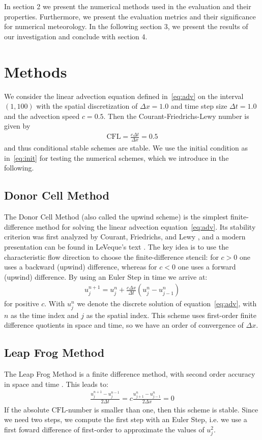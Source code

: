 In section 2 we present the numerical methods used in the evaluation and their properties. Furthermore, we present the evaluation metrics and their significance for numerical
meteorology.
In the following section 3, we present the results of our investigation and conclude with section 4.

\section{Methods}

We consider the linear advection equation defined in~\eqref{eq:adv} on the
interval $(1, 100)$ with the spatial discretization of $\Delta x= 1.0$ and time step size
$\Delta t = 1.0$ and the advection speed $c = 0.5$. Then the Courant-Friedrichs-Lewy number
is given by
\begin{align*}
    \mathrm{CFL} = \frac{c \Delta t}{\Delta x} = 0.5
\end{align*}
and thus conditional stable schemes are stable. We use the initial condition as 
in~\eqref{eq:init} for testing the numerical schemes, which we introduce in the following.

\subsection{Donor Cell Method}
The Donor Cell Method (also called the upwind scheme) is the simplest finite-difference
method for solving the linear advection equation~\eqref{eq:adv}. Its stability criterion
was first analyzed by Courant, Friedrichs, and Lewy \cite{Courant1928}, and a modern
presentation can be found in LeVeque’s text \cite{LeVeque2002}. The key idea is to use
the characteristic flow direction to choose the finite-difference stencil: for $c>0$
one uses a backward (upwind) difference, whereas for $c<0$ one uses a forward
(upwind) difference. By using an Euler Step in time we arrive at:
\begin{align*}
    u^{n+1}_j = u^n_j + \frac{c \Delta x}{\Delta t}(u^n_{j} - u^n_{j-1})
\end{align*}
for positive $c$. With $u^n_{j}$ we denote the discrete solution of equation~\eqref{eq:adv},
with $n$ as the time index and $j$ as the spatial index. This scheme uses first-order
finite difference quotients in space and time, so we have an order of convergence of $\Delta x$.

\subsection{Leap Frog Method}
The Leap Frog Method is a finite difference method, with second order accuracy in space and
time \cite{Durran2010}. This leads to:
\begin{align*}
    \frac{u_j^{n+1} -u_j^{n-1}}{2\Delta t} = c \frac{u^n_{j+1} - u^n_{j-1}}{2\Delta x} = 0
\end{align*}
If the absolute $\mathrm{CFL}$-number is smaller than one, then this scheme is stable.
Since we need two steps, we compute the first step with an Euler Step, i.e. we use a first
foward difference of first-order to approximate the values of $u^2_j$.
